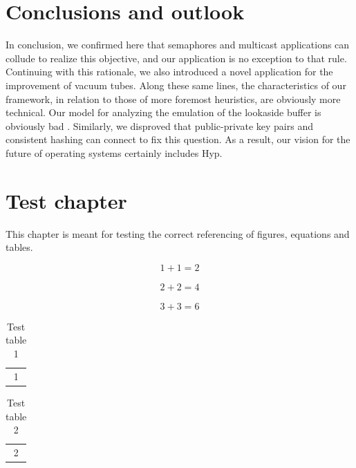 \chapter{Conclusions and outlook}
%
In conclusion, we confirmed here that semaphores and multicast applications can
collude to realize this objective, and our application is no exception to that
rule. Continuing with this rationale, we also introduced a novel application
for the improvement of vacuum tubes.
Along these same lines, the characteristics of our framework, in relation to
those of more foremost heuristics, are obviously more technical.
Our model for analyzing the emulation of the lookaside buffer is obviously bad
\cite{cite:19}.
Similarly, we disproved that public-private key pairs \cite{cite:20, cite:21,
cite:22} and consistent hashing  can connect to fix this question.
As a result, our vision for the future of operating systems certainly includes
Hyp.

\chapter{Test chapter}

This chapter is meant for testing the correct referencing of figures, equations
and tables.

%
\begin{equation}
	1 + 1 = 2
	\label{eq:test_eq1}
\end{equation}

\begin{align}
	2 + 2 = 4
	\label{eq:test_eq2}
\end{align}

\begin{equation}
	3 + 3 = 6
	\label{eq:test_eq3_intro}
\end{equation}

%
\begin{table}
	\centering
	\begin{tabular}{c}
		1
	\end{tabular}
	\caption{Test table 1}
	\label{tab:test_tab1}
\end{table}

\begin{table}
	\centering
	\begin{tabular}{c}
		2
	\end{tabular}
	\caption{Test table 2}
	\label{tab:test_tab2}
\end{table}

